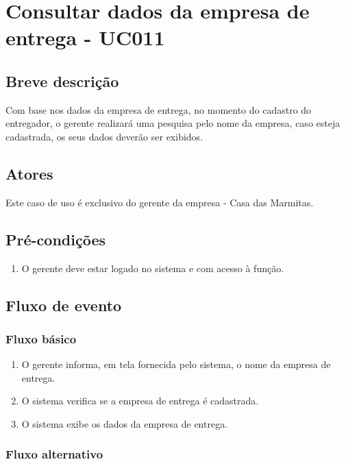 \chapter{Consultar dados da empresa de entrega - UC011} \label{uc011}

\section{Breve descrição}

Com base nos dados da empresa de entrega, no momento do cadastro do entregador, o gerente realizará uma pesquisa pelo nome da empresa, caso esteja cadastrada, os seus dados deverão ser exibidos.

\section{Atores}

Este caso de uso é exclusivo do gerente da empresa - Casa das Marmitas.

\section{Pré-condições}

\begin{enumerate}
	\item O gerente deve estar logado no sistema e com acesso à função.
\end{enumerate}

\section{Fluxo de evento}

\subsection{Fluxo básico}

\begin{enumerate}
	\item O gerente informa, em tela fornecida pelo sistema, o nome da empresa de entrega.	
	\item O sistema verifica se a empresa de entrega é cadastrada.
	\item O sistema exibe os dados da empresa de entrega.
\end{enumerate}

\subsection{Fluxo alternativo}

